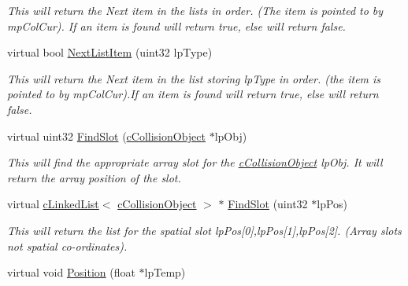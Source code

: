 \begin{DoxyCompactItemize}
\begin{DoxyCompactList}\small\item\em This will return the Next item in the lists in order. (The item is pointed to by mpColCur). If an item is found will return true, else will return false. \end{DoxyCompactList}\item 
\hypertarget{classc_collision_handler_a58b636db8343b7f4bbb27f3a93799e8b}{
virtual bool \hyperlink{classc_collision_handler_a58b636db8343b7f4bbb27f3a93799e8b}{NextListItem} (uint32 lpType)}
\label{classc_collision_handler_a58b636db8343b7f4bbb27f3a93799e8b}

\begin{DoxyCompactList}\small\item\em This will return the Next item in the list storing lpType in order. (the item is pointed to by mpColCur).If an item is found will return true, else will return false. \end{DoxyCompactList}\item 
\hypertarget{classc_collision_handler_ad2b079e234f956301fe83f5a5938cad0}{
virtual uint32 \hyperlink{classc_collision_handler_ad2b079e234f956301fe83f5a5938cad0}{FindSlot} (\hyperlink{classc_collision_object}{cCollisionObject} $\ast$lpObj)}
\label{classc_collision_handler_ad2b079e234f956301fe83f5a5938cad0}

\begin{DoxyCompactList}\small\item\em This will find the appropriate array slot for the \hyperlink{classc_collision_object}{cCollisionObject} lpObj. It will return the array position of the slot. \end{DoxyCompactList}\item 
\hypertarget{classc_collision_handler_aa6f7ca9d10b078ba11fcc3c0d266ab8e}{
virtual \hyperlink{classc_linked_list}{cLinkedList}$<$ \hyperlink{classc_collision_object}{cCollisionObject} $>$ $\ast$ \hyperlink{classc_collision_handler_aa6f7ca9d10b078ba11fcc3c0d266ab8e}{FindSlot} (uint32 $\ast$lpPos)}
\label{classc_collision_handler_aa6f7ca9d10b078ba11fcc3c0d266ab8e}

\begin{DoxyCompactList}\small\item\em This will return the list for the spatial slot lpPos\mbox{[}0\mbox{]},lpPos\mbox{[}1\mbox{]},lpPos\mbox{[}2\mbox{]}. (Array slots not spatial co-\/ordinates). \end{DoxyCompactList}\item 
\hypertarget{classc_collision_handler_aae512b7a5c7abb7307e7d25f22aa9fd0}{
virtual void \hyperlink{classc_collision_handler_aae512b7a5c7abb7307e7d25f22aa9fd0}{Position} (float $\ast$lpTemp)}
\label{classc_collision_handler_aae512b7a5c7abb7307e7d25f22aa9fd0}


\end{DoxyCompactItemize}
